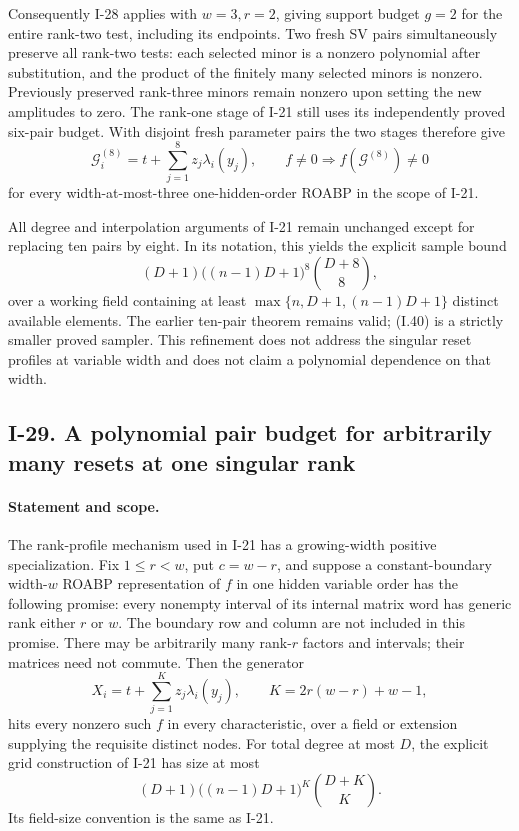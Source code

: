 \documentclass[11pt,a4paper]{article}
\theoremstyle{definition}\newtheorem{definition}{Definition}
\begin{document}
Consequently I-28 applies with $w=3,r=2$, giving support
budget $g=2$ for the entire rank-two test, including its
endpoints.  Two fresh SV pairs simultaneously preserve all
rank-two tests: each selected minor is a nonzero polynomial
after substitution, and the product of the finitely many
selected minors is nonzero.  Previously preserved rank-three
minors remain nonzero upon setting the new amplitudes to zero.
The rank-one stage of I-21 still uses its independently
proved six-pair budget.  With disjoint fresh parameter pairs
the two stages therefore give
\[
 \mathcal G_i^{(8)}
      =t+\sum_{j=1}^{8}z_j\lambda_i(y_j),
 \qquad f\ne0\Longrightarrow f(\mathcal G^{(8)})\ne0
 \tag{I.40}
\]
for every width-at-most-three one-hidden-order ROABP in the
scope of I-21.

All degree and interpolation arguments of I-21 remain
unchanged except for replacing ten pairs by eight.  In its
notation, this yields the explicit sample bound
\[
 (D+1)\bigl((n-1)D+1\bigr)^8\binom{D+8}{8},
 \tag{I.41}
\]
over a working field containing at least
$\max\{n,D+1,(n-1)D+1\}$ distinct available elements.
The earlier ten-pair theorem remains valid; (I.40) is a
strictly smaller proved sampler.  This refinement does not
address the singular reset profiles at variable width and
does not claim a polynomial dependence on that width.


\subsection{I-29. A polynomial pair budget for arbitrarily many resets at one singular rank}
\label{I-29}

\paragraph{Statement and scope.}
The rank-profile mechanism used in I-21 has a growing-width
positive specialization.  Fix $1\le r<w$, put $c=w-r$, and
suppose a constant-boundary width-$w$ ROABP representation
of $f$ in one hidden variable order has the following promise:
every nonempty interval of its internal matrix word has generic
rank either $r$ or $w$.  The boundary row and column are not
included in this promise.  There may be arbitrarily many
rank-$r$ factors and intervals; their matrices need not commute.
Then the generator
\[
 X_i=t+\sum_{j=1}^{K}z_j\lambda_i(y_j),
 \qquad K=2r(w-r)+w-1,
 \tag{I.42}
\]
hits every nonzero such $f$ in every characteristic, over a
field or extension supplying the requisite distinct nodes.
For total degree at most $D$, the explicit grid construction
of I-21 has size at most
\[
 (D+1)\bigl((n-1)D+1\bigr)^K\binom{D+K}{K}.
 \tag{I.43}
\]
Its field-size convention is the same as I-21.
\end{document}
